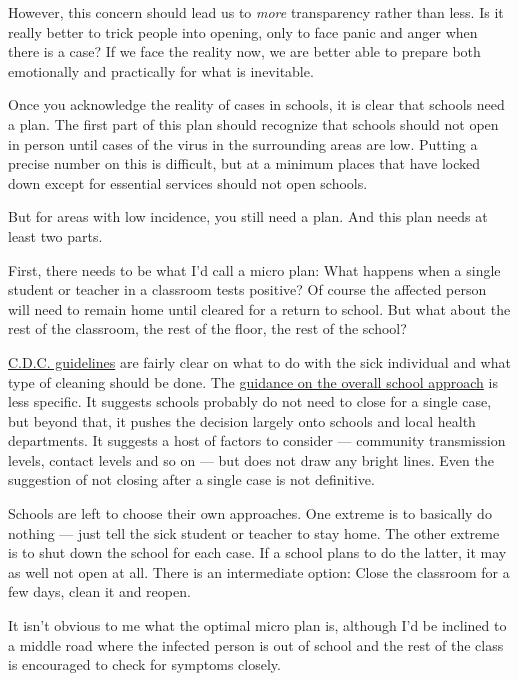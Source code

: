 However, this concern should lead us to \emph{more} transparency rather
than less. Is it really better to trick people into opening, only to
face panic and anger when there is a case? If we face the reality now,
we are better able to prepare both emotionally and practically for what
is inevitable.

Once you acknowledge the reality of cases in schools, it is clear that
schools need a plan. The first part of this plan should recognize that
schools should not open in person until cases of the virus in the
surrounding areas are low. Putting a precise number on this is
difficult, but at a minimum places that have locked down except for
essential services should not open schools.

But for areas with low incidence, you still need a plan. And this plan
needs at least two parts.

First, there needs to be what I'd call a micro plan: What happens when a
single student or teacher in a classroom tests positive? Of course the
affected person will need to remain home until cleared for a return to
school. But what about the rest of the classroom, the rest of the floor,
the rest of the school?

\href{https://www.cdc.gov/coronavirus/2019-ncov/community/schools-childcare/schools.html\#anchor_1589932092921}{C.D.C.
guidelines} are fairly clear on what to do with the sick individual and
what type of cleaning should be done. The
\href{http://cdc.gov/coronavirus/2019-ncov/community/schools-childcare/prepare-safe-return.html}{guidance
on the overall school approach} is less specific. It suggests schools
probably do not need to close for a single case, but beyond that, it
pushes the decision largely onto schools and local health departments.
It suggests a host of factors to consider --- community transmission
levels, contact levels and so on --- but does not draw any bright lines.
Even the suggestion of not closing after a single case is not
definitive.

Schools are left to choose their own approaches. One extreme is to
basically do nothing --- just tell the sick student or teacher to stay
home. The other extreme is to shut down the school for each case. If a
school plans to do the latter, it may as well not open at all. There is
an intermediate option: Close the classroom for a few days, clean it and
reopen.

It isn't obvious to me what the optimal micro plan is, although I'd be
inclined to a middle road where the infected person is out of school and
the rest of the class is encouraged to check for symptoms closely.

